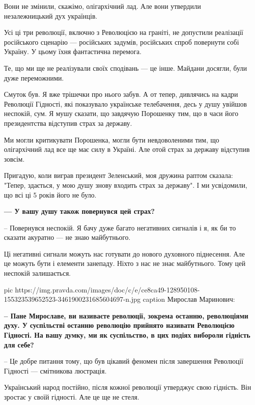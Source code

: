 Вони не змінили, скажімо, олігархічний лад. Але вони утвердили незалежницький
дух українців. 

Усі ці три революції, включно з Революцією на граніті, не допустили реалізації
російського сценарію --- російських задумів, російських спроб повернути собі
Україну. У цьому їхня фантастична перемога. 

Те, що ми ще не реалізували своїх сподівань --- це інше. Майдани досягли, були
дуже переможними.

Смуток був. Я вже трішечки про нього забув. А от тепер, дивлячись на кадри
Революції Гідності, які показувало українське телебачення, десь у душу увійшов
неспокій, сум. Я мушу сказати, що завдячую Порошенку тим, що в часи його
президентства відступив страх за державу. 

Ми могли критикувати Порошенка, могли бути невдоволеними тим, що олігархічний лад все ще має силу в Україні. Але отой страх за державу відступив зовсім.

Пригадую, коли виграв президент Зеленський, моя дружина раптом сказала: "Тепер, здається, у мою душу знову входить страх за державу". І ми усвідомили, що всі ці 5 років його не було.

{\bfseries --- У вашу душу також повернувся цей страх?  }

– Повернувся неспокій. Я бачу дуже багато негативних сигналів і я, як би то сказати акуратно --- не знаю майбутнього. 

Ці негативні сигнали можуть нас готувати до нового духовного піднесення. Але це
можуть бути і елементи занепаду. Ніхто з нас не знає майбутнього. Тому цей
неспокій залишається.

\ifcmt
pic https://img.pravda.com/images/doc/c/e/ce8ca49-128950108-155323539652523-3461900231685604697-n.jpg
caption Мирослав Маринович: 
\fi

\textbf{– Пане Мирославе, ви називаєте революції, зокрема останню, революціями духу. У
суспільстві останню революцію прийнято називати Революцією Гідності. На вашу
думку, ми як суспільство, в цих подіях вибороли гідність для себе?}

– Це добре питання тому, що був цікавий феномен після завершення Революції Гідності --- смітникова люстрація.

Український народ постійно, після кожної революції утверджує свою гідність. Він
зростає у своїй гідності. Але це ще не стеля. 

